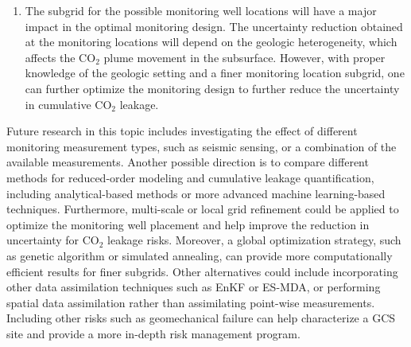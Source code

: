 \documentclass[a4paper,fleqn]{cas-sc}
\begin{document}
\begin{enumerate}
    \item The subgrid for the possible monitoring well locations will have a major impact in the optimal monitoring design. The uncertainty reduction obtained at the monitoring locations will depend on the geologic heterogeneity, which affects the CO$_2$ plume movement in the subsurface. However, with proper knowledge of the geologic setting and a finer monitoring location subgrid, one can further optimize the monitoring design to further reduce the uncertainty in cumulative CO$_2$ leakage.
\end{enumerate}

Future research in this topic includes investigating the effect of different monitoring measurement types, such as seismic sensing, or a combination of the available measurements. Another possible direction is to compare different methods for reduced-order modeling and cumulative leakage quantification, including analytical-based methods or more advanced machine learning-based techniques. Furthermore, multi-scale or local grid refinement could be applied to optimize the monitoring well placement and help improve the reduction in uncertainty for CO$_2$ leakage risks. Moreover, a global optimization strategy, such as genetic algorithm or simulated annealing, can provide more computationally efficient results for finer subgrids. Other alternatives could include incorporating other data assimilation techniques such as EnKF or ES-MDA, or performing spatial data assimilation rather than assimilating point-wise measurements. Including other risks such as geomechanical failure can help characterize a GCS site and provide a more in-depth risk management program. 


\printcredits



\end{document}
